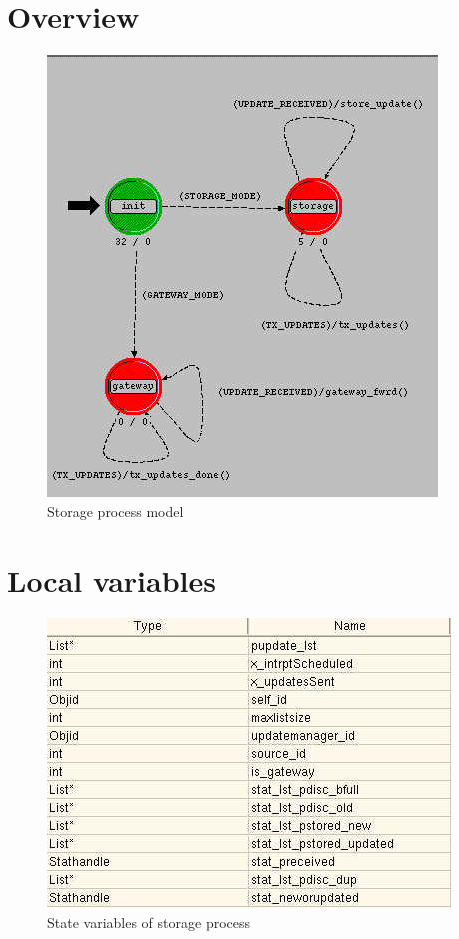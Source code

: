 

\section{Overview}
\begin{figure}[ht]
    \centering
    \includegraphics[scale=0.5]{images/p_storage}
    \caption{Storage process model}
    \label{fig:appendix-b}
\end{figure}

\newpage

\section{Local variables}
\begin{figure}[h]
    \centering
    \includegraphics[width=.7\textwidth]{images/state_variable_storage}
    \caption{State variables of storage process}
    \label{fig:appendix-b_sv}
\end{figure}

